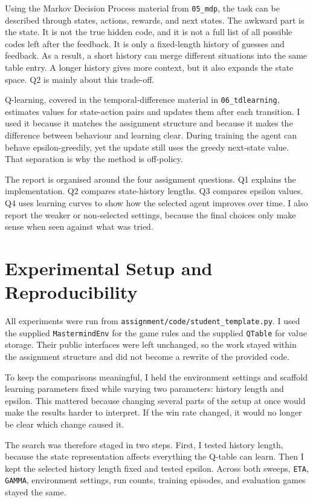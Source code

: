 \documentclass[11pt,a4paper]{article}
\begin{document}
Using the Markov Decision Process material from \texttt{05\_mdp}, the task can be described through states, actions, rewards, and next states. The awkward part is the state. It is not the true hidden code, and it is not a full list of all possible codes left after the feedback. It is only a fixed-length history of guesses and feedback. As a result, a short history can merge different situations into the same table entry. A longer history gives more context, but it also expands the state space. Q2 is mainly about this trade-off.

Q-learning, covered in the temporal-difference material in \texttt{06\_tdlearning}, estimates values for state-action pairs and updates them after each transition. I used it because it matches the assignment structure and because it makes the difference between behaviour and learning clear. During training the agent can behave epsilon-greedily, yet the update still uses the greedy next-state value. That separation is why the method is off-policy.

The report is organised around the four assignment questions. Q1 explains the implementation. Q2 compares state-history lengths. Q3 compares epsilon values. Q4 uses learning curves to show how the selected agent improves over time. I also report the weaker or non-selected settings, because the final choices only make sense when seen against what was tried.

\section{Experimental Setup and Reproducibility}

All experiments were run from \texttt{assignment/code/student\_template.py}. I used the supplied \texttt{MastermindEnv} for the game rules and the supplied \texttt{QTable} for value storage. Their public interfaces were left unchanged, so the work stayed within the assignment structure and did not become a rewrite of the provided code.

To keep the comparisons meaningful, I held the environment settings and scaffold learning parameters fixed while varying two parameters: history length and epsilon. This mattered because changing several parts of the setup at once would make the results harder to interpret. If the win rate changed, it would no longer be clear which change caused it.

The search was therefore staged in two steps. First, I tested history length, because the state representation affects everything the Q-table can learn. Then I kept the selected history length fixed and tested epsilon. Across both sweeps, \texttt{ETA}, \texttt{GAMMA}, environment settings, run counts, training episodes, and evaluation games stayed the same.
\end{document}
